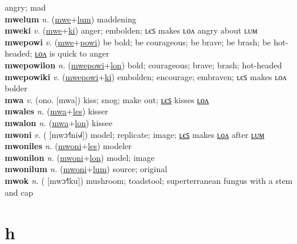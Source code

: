 angry; mad \label{mwelon} \\
\textbf{mwelum} \textit{n.} (\hyperref[mwe]{mwe}+\hyperref[lum]{lum})
maddening \label{mwelum} \\
\textbf{mweki} \textit{v.} (\hyperref[mwe]{mwe}+\hyperref[ki]{ki})
anger; embolden; ʟєꜱ makes ʟᴏᴧ angry about ʟᴜᴍ \label{mweki} \\
\textbf{mwepowi} \textit{v.} (\hyperref[mwe]{mwe}+\hyperref[powi]{powi})
be bold; be courageous; be brave; be brash; be hot-headed; \hyperref[mwepowilon]{ʟᴏᴧ} is quick to anger \label{mwepowi} \\
\textbf{mwepowilon} \textit{n.} (\hyperref[mwepowi]{mwepowi}+\hyperref[lon]{lon})
bold; courageous; brave; brash; hot-headed \label{mwepowilon} \\
\textbf{mwepowiki} \textit{v.} (\hyperref[mwepowi]{mwepowi}+\hyperref[ki]{ki})
embolden; encourage; embraven; ʟєꜱ makes ʟᴏᴧ bolder \label{mwepowiki} \\
\textbf{mwa} \textit{v.} (ono. [mwa])
kiss; snog; make out; \hyperref[mwales]{ʟєꜱ} kisses \hyperref[mwalon]{ʟᴏᴧ} \label{mwa} \\
\textbf{mwales} \textit{n.} (\hyperref[mwa]{mwa}+\hyperref[les]{les})
kisser \label{mwales} \\
\textbf{mwalon} \textit{n.} (\hyperref[mwa]{mwa}+\hyperref[lon]{lon})
kissee \label{mwalon} \\
\textbf{mwoni} \textit{v.} ( [mwɔ˧˥ni˧˩˧])
model; replicate; image; \hyperref[mwoniles]{ʟєꜱ} makes \hyperref[mwonilon]{ʟᴏᴧ} after \hyperref[mwonilum]{ʟᴜᴍ} \label{mwoni} \\
\textbf{mwoniles} \textit{n.} (\hyperref[mwoni]{mwoni}+\hyperref[les]{les})
modeler \label{mwoniles} \\
\textbf{mwonilon} \textit{n.} (\hyperref[mwoni]{mwoni}+\hyperref[lon]{lon})
model; image \label{mwonilon} \\
\textbf{mwonilum} \textit{n.} (\hyperref[mwoni]{mwoni}+\hyperref[lum]{lum})
source; original \label{mwonilum} \\
\textbf{mwok} \textit{n.} ( [mwɔ˧˥ku])
mushroom; toadstool; superterranean fungus with a stem and cap \label{mwok} 

\section{h}

